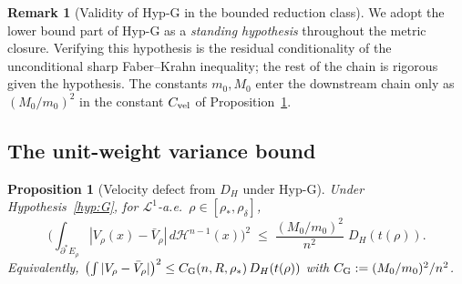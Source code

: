 \documentclass[11pt]{article}
\newtheorem{proposition}[theorem]{Proposition}
\theoremstyle{definition}
\newtheorem{remark}[theorem]{Remark}
\newcommand{\rstar}{\rho_{*}}
\begin{document}
\begin{remark}[Validity of Hyp-G in the bounded reduction class]
We adopt the lower bound part of Hyp-G as a \emph{standing hypothesis}
throughout the metric closure.  Verifying this hypothesis is the
residual conditionality of the unconditional sharp Faber--Krahn
inequality; the rest of the chain is rigorous given the hypothesis.
The constants $m_{0},M_{0}$ enter the downstream chain only as
$(M_{0}/m_{0})^{2}$ in the constant $C_{\rm vel}$ of
Proposition~\ref{prop:V-bar-V}.
\end{remark}

\subsection{The unit-weight variance bound}\label{ssec:unitvar}

\begin{proposition}[Velocity defect from $D_{H}$ under Hyp-G]
\label{prop:V-bar-V}
Under Hypothesis~\ref{hyp:G}, for $\mathcal L^{1}$-a.e.\
$\rho\in[\rstar,\rho_{\delta}]$,
\begin{equation}\label{eq:V-bar-V-bound}
   \Biggl(\int_{\partial^{*}E_{\rho}}\!\!|V_{\rho}(x)-\bar V_{\rho}|\,
     d\mathcal H^{n-1}(x)\Biggr)^{\!2}
   \;\le\;\frac{(M_{0}/m_{0})^{2}}{n^{2}}\;
     D_{H}(t(\rho)).
\end{equation}
Equivalently, $\bigl(\int|V_{\rho}-\bar V_{\rho}|\bigr)^{2}\le
C_{\rm G}(n,R,\rstar)\,D_{H}(t(\rho))$ with
$C_{\rm G}:=(M_{0}/m_{0})^{2}/n^{2}$.
\end{proposition}
\end{document}
